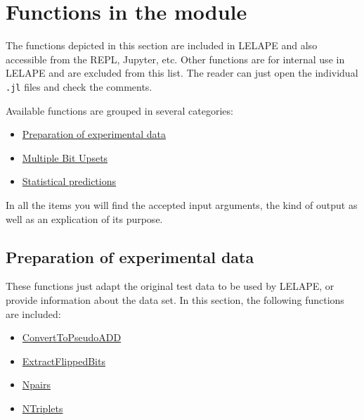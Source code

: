  \section{Functions in the module}
 The functions depicted in this section are included in LELAPE and also accessible from the REPL, Jupyter, etc. Other functions are for internal use in LELAPE and are excluded from this list. The reader can just open the individual \texttt{.jl} files and check the comments.
 
 Available functions are grouped in several categories:
 \begin{itemize}
 	\item \hyperref[SubseC:PreparationExpdata]{Preparation of experimental data}
 	\item \hyperref[SubSeC:MBUs]{Multiple Bit Upsets}
 	\item \hyperref[Subsec:StatisticalPredictions]{Statistical predictions}
 \end{itemize}
 In all the items you will find the accepted input arguments, the kind of output as well as an explication of its purpose.
 \subsection{Preparation of experimental data}\label{SubseC:PreparationExpdata}
 These functions just adapt the original test data to be used by LELAPE, or provide information about the data set. In this section, the following functions are included:
 \begin{itemize}
 	\item \hyperref[Func:ConvertToPseudoADD]{ConvertToPseudoADD}
 	\item \hyperref[Func:ExtractFlippedBits]{ExtractFlippedBits}
 	\item \hyperref[Func:Npairs]{Npairs}
 	\item \hyperref[Func:NTriplets]{NTriplets}
 \end{itemize}
